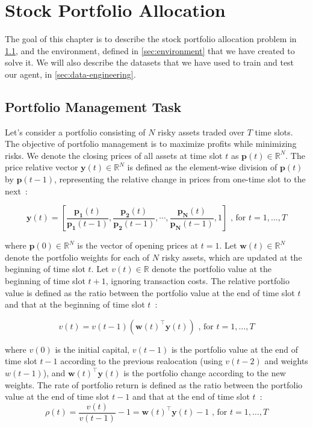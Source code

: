 \documentclass[../xlapes02]{subfiles}
\begin{document}
    \chapter{Stock Portfolio Allocation}\label{ch:stock-portfolio-allocation}
    The goal of this chapter is to describe the stock portfolio allocation problem in \cref{sec:portfolio-management-task}, and the environment, defined in \cref{sec:environment} that we have created to solve it. We will also describe the datasets that we have used to train and test our agent, in \cref{sec:data-engineering}.


    \section{Portfolio Management Task}\label{sec:portfolio-management-task}
    Let's consider a portfolio consisting of $N$ risky assets traded over $T$ time slots. The objective of portfolio management is to maximize profits while minimizing risks. We denote the closing prices of all assets at time slot $t$ as $\mathbf{p}(t) \in \mathbb{R}^N$. The price relative vector $\mathbf{y}(t) \in \mathbb{R}^N$ is defined as the element-wise division of $\mathbf{p}(t)$ by $\mathbf{p}(t-1)$, representing the relative change in prices from one-time slot to the next~\cite{finrl-portfolio-allocation-2020}:

    \begin{equation}
        \mathbf{y}(t)=\left[\frac{\mathbf{p_1}(t)}{\mathbf{p_1}(t-1)}, \frac{\mathbf{p_2}(t)}{\mathbf{p_2}(t-1)}, \cdots, \frac{\mathbf{p_N}(t)}{\mathbf{p_N}(t-1)}, 1\right]\text{ , for }t=1,\ldots,T
    \end{equation}

    where $\mathbf{p}(0) \in \mathbb{R}^N$ is the vector of opening prices at $t = 1$. Let $\mathbf{w}(t) \in \mathbb{R}^N$ denote the portfolio weights for each of $N$ risky assets, which are updated at the beginning of time slot $t$. Let $v(t) \in \mathbb{R}$ denote the portfolio value at the beginning of time slot $t+1$, ignoring transaction costs. The relative portfolio value is defined as the ratio between the portfolio value at the end of time slot $t$ and that at the beginning of time slot $t$~\cite{finrl-portfolio-allocation-2020}:

    \begin{equation}
        v(t)=v(t-1)(\mathbf{w}(t)^\top\mathbf{y}(t))\text{ , for }t=1,\ldots,T
    \end{equation}

    where $v(0)$ is the initial capital, $v(t-1)$ is the portfolio value at the end of time slot $t-1$ according to the previous realocation (using $v(t-2)$ and weights $w(t-1)$), and $\mathbf{w}(t)^\top\mathbf{y}(t)$ is the portfolio change according to the new weights. The rate of portfolio return is defined as the ratio between the portfolio value at the end of time slot $t-1$ and that at the end of time slot $t$~\cite{finrl-portfolio-allocation-2020}:
    \begin{equation}
        \rho(t)=\frac{v(t)}{v(t-1)}-1=\mathbf{w}(t)^\top\mathbf{y}(t)-1\text{ , for }t=1,\ldots,T
    \end{equation}
\end{document}
